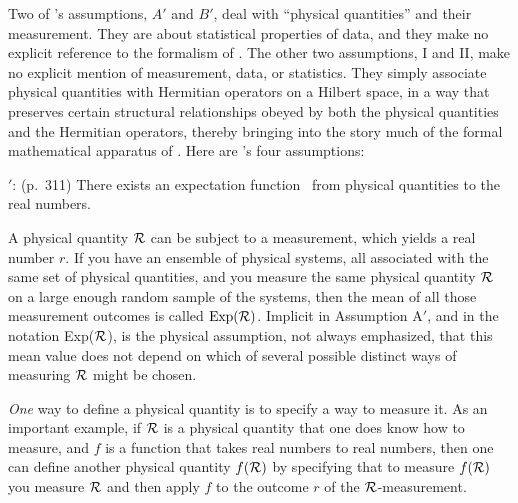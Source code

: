 Two of \vN's assumptions,  $A'$ and $B'$, deal with ``physical quantities'' and their measurement.   They are about statistical properties of data,  and they make no explicit reference  to the formalism of \qm.   
The other two assumptions,  I and II, make no explicit mention of measurement, data, or statistics.   They simply associate physical quantities  with Hermitian operators on a Hilbert space,  in a way that preserves certain structural relationships obeyed by both the physical quantities and the Hermitian operators, thereby bringing into the story much of the formal mathematical apparatus  of \qm.    Here are \vN's four assumptions:  
\medskip

$'$:  (p.~311)   There exists an expectation function \Exp\ from physical quantities to the real numbers.

A physical quantity ${\cal R}$ can be subject to a measurement, which yields a real number $r$.    If you have an ensemble of physical systems, all associated with the same set of physical quantities, and you measure the same physical quantity ${\cal R}$ on a  large enough random sample of the systems, then the mean of all those measurement outcomes is called ${\rm Exp}({\cal R})$.  %
Implicit in Assumption A$'$, and in the notation Exp(${\cal R}$), is the physical assumption, not always emphasized,  that %
this mean value does not depend on which of several possible distinct ways of measuring ${\cal R}$ might be chosen.  

{\it One\/} way to define a  physical quantity is to specify a way to measure it.    As an important example,   if ${\cal R}$ is a physical quantity that one does know how to measure, and  $f$ is a function that takes real numbers to real numbers, then one can define another physical quantity $f({\cal R})$ by specifying that  to measure $f({\cal R})$  you measure ${\cal R}$ and then apply $f$ to the outcome $r$ of the ${\cal R}$-measurement.

